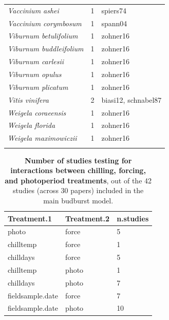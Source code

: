 \documentclass{article}
\begin{document}
\begin{footnotesize}
\begin{longtable}{p{}p{}p{}}
  \textit{Vaccinium ashei} &   1 & spiers74 \\ 
  \textit{Vaccinium corymbosum} &   1 & spann04 \\ 
  \textit{Viburnum betulifolium} &   1 & zohner16 \\ 
  \textit{Viburnum buddleifolium} &   1 & zohner16 \\ 
  \textit{Viburnum carlesii} &   1 & zohner16 \\ 
  \textit{Viburnum opulus} &   1 & zohner16 \\ 
  \textit{Viburnum plicatum} &   1 & zohner16 \\ 
  \textit{Vitis vinifera} &   2 & biasi12, schnabel87 \\ 
  \textit{Weigela coraeensis} &   1 & zohner16 \\ 
  \textit{Weigela florida} &   1 & zohner16 \\ 
  \textit{Weigela maximowiczii} &   1 & zohner16 \\ 
   \hline
\hline
\label{tab:sp}
\end{longtable}

\begin{table}[ht]
\centering
\caption{\textbf{Number of studies testing for interactions between chilling, forcing, and photoperiod treatments}, out of the 42 studies (across 30 papers) included in the main budburst model.} 
\label{tab:intxn}
\begingroup\footnotesize
\begin{tabular}{|p{}|p{}|p{}|}
  \hline
Treatment.1 & Treatment.2 & n.studies \\ 
  \hline
photo & force &   5 \\ 
  chilltemp & force &   1 \\ 
  chilldays & force &   5 \\ 
  chilltemp & photo &   1 \\ 
  chilldays & photo &   7 \\ 
  fieldsample.date & force &   7 \\ 
  fieldsample.date & photo &  10 \\ 
   \hline
\end{tabular}
\endgroup
\end{table}


\end{footnotesize}
\end{document}

